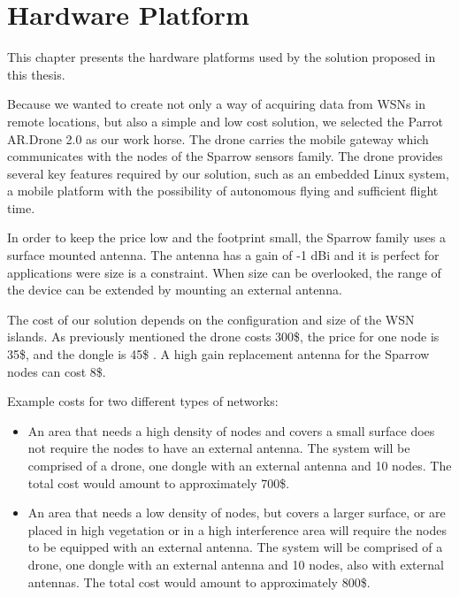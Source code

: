 \normalfont\normalsize
\chapter{Hardware Platform}

This chapter presents the hardware platforms used by the solution proposed in this thesis. 

Because we wanted to create not only a way of acquiring data from WSNs in remote locations, but also a simple and low cost solution, we selected the Parrot AR.Drone 2.0 as our work horse. The drone carries the mobile gateway which communicates with the nodes of the Sparrow sensors family. The drone provides several key features required by our solution, such as an embedded Linux system, a mobile platform with the possibility of autonomous flying and sufficient flight time.

In order to keep the price low and the footprint small, the Sparrow family uses a surface mounted antenna. The antenna has a gain of -1 dBi and it is perfect for applications were size is a constraint. When size can be overlooked, the range of the device can be extended by mounting an external antenna.

The cost of our solution depends on the configuration and size of the WSN islands. As previously mentioned the drone costs 300\$, the price for one node is 35\$, and the dongle is 45\$ . A high gain replacement antenna for the Sparrow nodes can cost 8\$.

Example costs for two different types of networks:
\begin{itemize}

\item An area that needs a high density of nodes and covers a small surface does not require the nodes to have an external antenna. The system will be comprised of a drone, one dongle with an external antenna and 10 nodes. The total cost would amount to approximately 700\$.

\item  An area that needs a low density of nodes, but covers a larger surface, or are placed in high vegetation or in a high interference area will require the nodes to be equipped with an external antenna.  The system will be comprised of a drone, one dongle with an external antenna and 10 nodes, also with external antennas. The total cost would amount to approximately 800\$.

\end{itemize}

